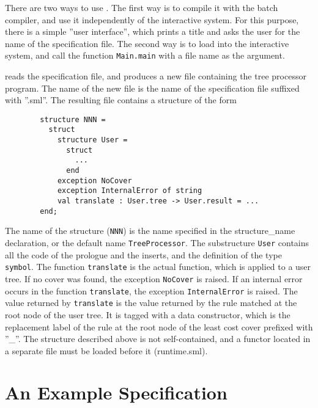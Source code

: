 There are two ways to use \mltwig. The first way is to compile it
with the batch compiler, and use it
independently of the interactive system. For this purpose, there is
a simple ''user interface'', which prints a title and asks the user
for the name of the specification file.
The second way is to load \mltwig into the interactive system, and call
the function {\tt Main.main} with a file name as the argument.

\mltwig reads the specification file, and produces a new file containing
the tree processor program. The name of the new file is the name of
the specification file suffixed with ''.sml''. 
The resulting file contains a structure of the form
\begin{verbatim}
        structure NNN =
          struct
            structure User =
              struct
                ...
              end
            exception NoCover
            exception InternalError of string
            val translate : User.tree -> User.result = ...
        end;
\end{verbatim}
The name of the structure ({\tt NNN}) is the name specified in the
structure\_name declaration, or the default name {\tt TreeProcessor}.
The substructure {\tt User} contains all the code of the prologue and
the inserts, and the definition of the type {\tt symbol}.
The function {\tt translate} is the actual function, which
is applied to a user tree. If no cover was found, the exception
{\tt NoCover} is raised. If an internal error occurs in the function
{\tt translate}, the exception {\tt InternalError} is raised.
The value returned by {\tt translate} is the value returned by
the rule matched at the root node of the user tree. It is tagged
with a data constructor, which is the replacement label of the
rule at the root node of the least cost cover prefixed with ''\_''.
The structure described above is not self-contained, and a functor
located in a separate file must be loaded before it (runtime.sml).

\section{An Example \mltwig Specification}


